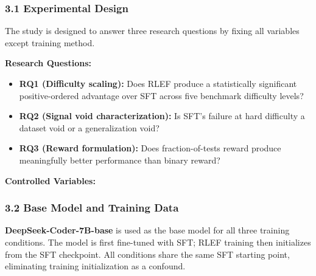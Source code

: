 
\subsubsection{3.1 Experimental Design}

The study is designed to answer three research questions by fixing all variables except training method.

\textbf{Research Questions:}
\begin{itemize}
\item \textbf{RQ1 (Difficulty scaling):} Does RLEF produce a statistically significant positive-ordered advantage over SFT across five benchmark difficulty levels?
\item \textbf{RQ2 (Signal void characterization):} Is SFT's failure at hard difficulty a dataset void or a generalization void?
\item \textbf{RQ3 (Reward formulation):} Does fraction-of-tests reward produce meaningfully better performance than binary reward?
\end{itemize}

\textbf{Controlled Variables:}

\begin{table}[htbp]
\centering
{}
\end{table}

\subsubsection{3.2 Base Model and Training Data}

\textbf{DeepSeek-Coder-7B-base} \citep{Guo2024DeepSeekCoder} is used as the base model for all three training conditions. The model is first fine-tuned with SFT; RLEF training then initializes from the SFT checkpoint. All conditions share the same SFT starting point, eliminating training initialization as a confound.

